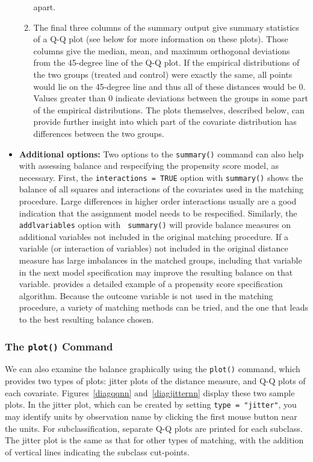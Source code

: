 \begin{itemize}
\begin{enumerate}
    apart.
  \item The final three columns of the summary output give summary
    statistics of a Q-Q plot (see below for more information on these
    plots). Those columns give the median, mean, and maximum
    orthogonal deviations from the 45-degree line of the Q-Q plot.  If
    the empirical distributions of the two groups (treated and
    control) were exactly the same, all points would lie on the
    45-degree line and thus all of these distances would be 0.  Values
    greater than 0 indicate deviations between the groups in some part
    of the empirical distributions.  The plots themselves, described
    below, can provide further insight into which part of the
    covariate distribution has differences between the two groups.
\end{enumerate}

\item {\bf Additional options:} Two options to the \texttt{summary()}
  command can also help with assessing balance and respecifying the
  propensity score model, as necessary.  First, the {\tt interactions
    = TRUE} option with {\tt summary()} shows the balance of all
  squares and interactions of the covariates used in the matching
  procedure.  Large differences in higher order interactions usually
  are a good indication that the assignment model needs to be
  respecified.  Similarly, the {\tt addlvariables} option with {\tt
    summary()} will provide balance measures on additional variables
  not included in the original matching procedure.  If a variable (or
  interaction of variables) not included in the original distance
  measure has large imbalances in the matched groups, including that
  variable in the next model specification may improve the resulting
  balance on that variable.  \cite{DehWah99} provides a detailed
  example of a propensity score specification algorithm.  Because the
  outcome variable is not used in the matching procedure, a variety of
  matching methods can be tried, and the one that leads to the best
  resulting balance chosen.
\end{itemize}

\subsubsection{The \texttt{plot()} Command}

We can also examine the balance graphically using the \texttt{plot()}
command, which provides two types of plots: jitter plots of the
distance measure, and Q-Q plots of each covariate.
Figures~\ref{diagqqnn} and~\ref{diagjitternn} display these two sample
plots.  In the jitter plot, which can be created by setting
\texttt{type = "jitter"}, you may identify units by observation name
by clicking the first mouse button near the units. For
subclassification, separate Q-Q plots are printed for each subclass.
The jitter plot is the same as that for other types of matching, with
the addition of vertical lines indicating the subclass cut-points.

